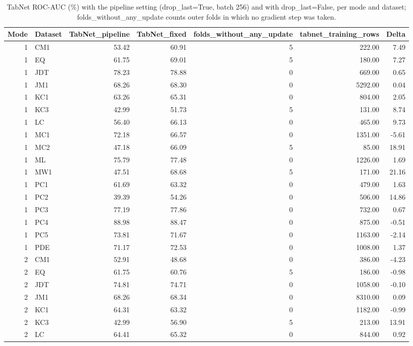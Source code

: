 \begin{table}
\caption{TabNet ROC-AUC (\%) with the pipeline setting (drop\_last=True, batch 256) and with drop\_last=False, per mode and dataset; folds\_without\_any\_update counts outer folds in which no gradient step was taken.}
\label{tab:r32_tabnet_dataset}
\begin{tabular}{rlrrrrr}
\toprule
Mode & Dataset & TabNet\_pipeline & TabNet\_fixed & folds\_without\_any\_update & tabnet\_training\_rows & Delta \\
\midrule
1 & CM1 & 53.42 & 60.91 & 5 & 222.00 & 7.49 \\
1 & EQ & 61.75 & 69.01 & 5 & 180.00 & 7.27 \\
1 & JDT & 78.23 & 78.88 & 0 & 669.00 & 0.65 \\
1 & JM1 & 68.26 & 68.30 & 0 & 5292.00 & 0.04 \\
1 & KC1 & 63.26 & 65.31 & 0 & 804.00 & 2.05 \\
1 & KC3 & 42.99 & 51.73 & 5 & 131.00 & 8.74 \\
1 & LC & 56.40 & 66.13 & 0 & 465.00 & 9.73 \\
1 & MC1 & 72.18 & 66.57 & 0 & 1351.00 & -5.61 \\
1 & MC2 & 47.18 & 66.09 & 5 & 85.00 & 18.91 \\
1 & ML & 75.79 & 77.48 & 0 & 1226.00 & 1.69 \\
1 & MW1 & 47.51 & 68.68 & 5 & 171.00 & 21.16 \\
1 & PC1 & 61.69 & 63.32 & 0 & 479.00 & 1.63 \\
1 & PC2 & 39.39 & 54.26 & 0 & 506.00 & 14.86 \\
1 & PC3 & 77.19 & 77.86 & 0 & 732.00 & 0.67 \\
1 & PC4 & 88.98 & 88.47 & 0 & 875.00 & -0.51 \\
1 & PC5 & 73.81 & 71.67 & 0 & 1163.00 & -2.14 \\
1 & PDE & 71.17 & 72.53 & 0 & 1008.00 & 1.37 \\
2 & CM1 & 52.91 & 48.68 & 0 & 386.00 & -4.23 \\
2 & EQ & 61.75 & 60.76 & 5 & 186.00 & -0.98 \\
2 & JDT & 74.81 & 74.71 & 0 & 1058.00 & -0.10 \\
2 & JM1 & 68.26 & 68.34 & 0 & 8310.00 & 0.09 \\
2 & KC1 & 64.31 & 63.32 & 0 & 1182.00 & -0.99 \\
2 & KC3 & 42.99 & 56.90 & 5 & 213.00 & 13.91 \\
2 & LC & 64.41 & 65.32 & 0 & 844.00 & 0.92 \\

\end{tabular}
\end{table}
